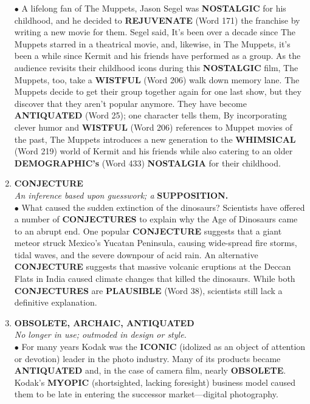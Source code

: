 \documentclass{book}
\begin{document}
\begin{enumerate}
$\bullet$ A lifelong fan of The Muppets, Jason Segel was \textbf{NOSTALGIC} for his childhood, and he decided to  \textbf{REJUVENATE} (Word 171) the franchise by writing a new movie for them. Segel said,  It's been over a decade since The Muppets starred in a theatrical movie, and, likewise, in The Muppets, it's been a while since Kermit and his friends have performed as a group. As the audience revisits their childhood icons during this \textbf{NOSTALGIC} film, The Muppets, too, take a \textbf{WISTFUL} (Word 206) walk down memory lane. The Muppets decide to get their group together again for one last show, but they discover that they aren't popular anymore. They have become \textbf{ANTIQUATED} (Word 25); one character tells them,  By incorporating clever humor and  \textbf{WISTFUL} (Word 206) references to Muppet movies of the past, The Muppets introduces a new generation to the \textbf{WHIMSICAL} (Word 219) world of Kermit and his friends while also catering to an older \textbf{DEMOGRAPHIC's} (Word 433)  \textbf{ NOSTALGIA} for their childhood.

\item \textbf{CONJECTURE}\\
\textit{ An inference based upon guesswork; a} \textbf{SUPPOSITION.}\\

$\bullet$ What caused the sudden extinction of the dinosaurs? Scientists have offered a number of \textbf{CONJECTURES} to explain why the Age of Dinosaurs came to an abrupt end. One popular \textbf{CONJECTURE} suggests that a giant meteor struck Mexico's Yucatan Peninsula, causing wide-spread fire storms, tidal waves, and the severe downpour of acid rain. An alternative \textbf{CONJECTURE} suggests that massive volcanic eruptions at the Deccan Flats in India caused climate changes that killed the dinosaurs. While both \textbf{CONJECTURES} are \textbf{PLAUSIBLE} (Word 38), scientists still lack a definitive explanation. 

\item \textbf{OBSOLETE, ARCHAIC, ANTIQUATED} \\ \textit{No longer in use; outmoded in design or style.}\\

$\bullet$ For many years Kodak was the \textbf{ICONIC} (idolized as an object of attention or devotion) leader in the photo industry. Many of its products became \textbf{ANTIQUATED} and, in the case of camera film, nearly \textbf{OBSOLETE}. Kodak's \textbf{MYOPIC} (shortsighted, lacking foresight) business model caused them to be late in entering the successor market—digital photography.


\end{enumerate}
\end{document}
